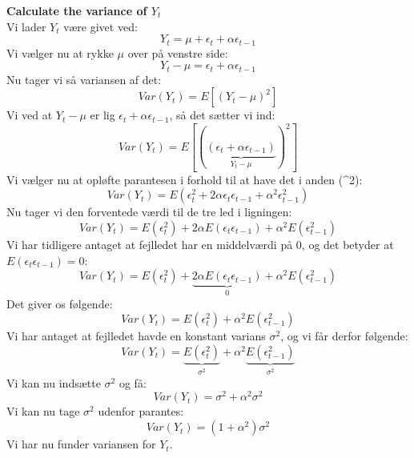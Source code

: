 \documentclass[
  10pt,
]{article}
\begin{document}
\textbf{Calculate the variance of $Y_t$}\\
Vi lader \(Y_t\) være givet ved:\\
\[Y_t = \mu + \epsilon_t + \alpha \epsilon_{t-1}\] Vi vælger nu at rykke
\(\mu\) over på venstre side:\\
\[Y_t - \mu = \epsilon_t + \alpha \epsilon_{t-1} \] Nu tager vi så
variansen af det: \[Var(Y_t) = E[(Y_t - \mu)^2] \] Vi ved at
\(Y_t - \mu\) er lig \(\epsilon_t + \alpha \epsilon_{t-1}\), så det
sætter vi ind:\\
\[Var(Y_t) = E[(\underbrace{(\epsilon_t + \alpha \epsilon_{t-1})}_\text{$Y_t - \mu $})^2] \]
Vi vælger nu at opløfte parantesen i forhold til at have det i anden
(\^{}2):\\
\[Var(Y_t) = E(\epsilon_t^2+2\alpha \epsilon_t \epsilon_{t-1} + \alpha^2 \epsilon_{t-1}^2) \]
Nu tager vi den forventede værdi til de tre led i ligningen:\\
\[Var(Y_t) = E(\epsilon_t^2) +2\alpha E(\epsilon_t \epsilon_{t-1}) + \alpha^2 E( \epsilon_{t-1}^2) \]
Vi har tidligere antaget at fejlledet har en middelværdi på 0, og det
betyder at \(E(\epsilon_t \epsilon_{t-1})=0\):\\
\[Var(Y_t) = E(\epsilon_t^2) + \underbrace{2\alpha E(\epsilon_t \epsilon_{t-1})}_\text{0} + \alpha^2 E( \epsilon_{t-1}^2) \]
Det giver os følgende:\\
\[Var(Y_t) = E(\epsilon_t^2) + \alpha^2E( \epsilon_{t-1}^2) \] Vi har
antaget at fejlledet havde en konstant varians \(\sigma^2\), og vi får
derfor følgende:\\
\[Var(Y_t) = \underbrace{E(\epsilon_t^2)}_\text{$\sigma^2$} + \alpha^2\underbrace{E(\epsilon_{t-1}^2)}_\text{$\sigma^2$} \]
Vi kan nu indsætte \(\sigma^2\) og få:\\
\[Var(Y_t) = \sigma^2 + \alpha^2\sigma^2 \] Vi kan nu tage \(\sigma^2\)
udenfor parantes:\\
\[Var(Y_t) = (1 + \alpha^2)\sigma^2 \] Vi har nu funder variansen for
\(Y_t\).\\
\end{document}
